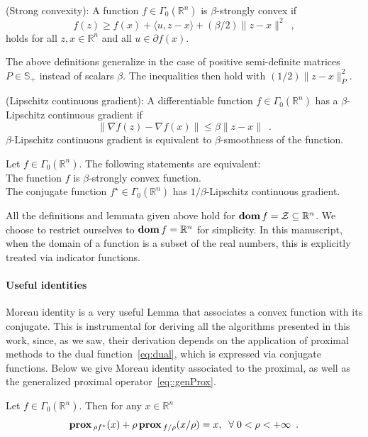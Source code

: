 \documentclass[openany]{now}
\newcommand{\reals}{{\mathbb R}}
\newcommand{\psd}{{\mathbb S}}
\newcommand{\dom}{\mathop{\bf dom}}
\newcommand{\prox}{\mathop{\bf prox}}
\begin{document}
  (Strong convexity): A function $f\in\Gamma_0(\reals^n)$ is $\beta$-strongly convex if
\[
 f(z) \ge f(x) + \langle u, z-x\rangle + (\beta/2)\|z-x\|^2\enspace,
\]
holds for all $z,x\in\reals^n$ and all $u\in\partial f(x)$.

\remark The above definitions generalize in the case of positive semi-definite matrices $P\in\psd_+$ instead of scalars $\beta$. The inequalities then hold with $(1/2)\|z-x\|^2_P$.

 (Lipschitz continuous gradient): A differentiable function $f\in\Gamma_0(\reals^n)$ has a $\beta$-Lipschitz continuous gradient if
\[
 \|\nabla f(z) - \nabla f(x)\| \le \beta\|z-x\|\enspace.
\]
$\beta$-Lipschitz continuous gradient is equivalent to $\beta$-smoothness of the function.

\begin{lemma}{\label{App:BH}}
Let $f\in\Gamma_0(\reals^n)$. The following statements are equivalent:\\
The function $f$ is $\beta$-strongly convex function.\\
The conjugate function $f^\star\in\Gamma_0(\reals^n)$ has $1/\beta$-Lipschitz continuous gradient.
\end{lemma}

\begin{remark}
 All the definitions and lemmata given above hold for $\dom f=\mathcal{Z}\subseteq\reals^n$. We choose to restrict ourselves to $\dom f=\reals^n$ for simplicity. In this manuscript, when the domain of a function is a subset of the real numbers, this is explicitly treated via indicator functions.
\end{remark}

\paragraph{Useful identities}

Moreau identity is a very useful Lemma that associates a convex function with its conjugate. This is instrumental for deriving all the algorithms presented in this work, since, as we saw, their derivation depends on the application of proximal methods to the dual function~\eqref{eq:dual}, which is expressed via conjugate functions. Below we give Moreau identity associated to the proximal, as well as the generalized proximal operator~\eqref{eq::genProx}.
\begin{lemma}{\label{App.:Moreau}}
 Let $f\in \Gamma_0(\reals^n)$. Then for any $x\in\reals^n$
 \[
  \prox{_{\rho f^{\star}}}(x) + \rho \prox{_{f/\rho}}(x/\rho) = x, \;\; \forall\; 0 < \rho < +\infty\enspace.
 \]
\end{lemma}
\end{document}

